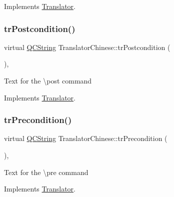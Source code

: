 Implements \mbox{\hyperlink{class_translator}{Translator}}.

\mbox{\label{class_translator_chinese_a915d9d788979b90c58b8e46849b7c747}} 
\subsubsection{\texorpdfstring{trPostcondition()}{trPostcondition()}}
{\footnotesize\ttfamily virtual \mbox{\hyperlink{class_q_c_string}{Q\+C\+String}} Translator\+Chinese\+::tr\+Postcondition (\begin{DoxyParamCaption}{ }\end{DoxyParamCaption})\hspace{0.3cm}{\ttfamily [inline]}, {\ttfamily [virtual]}}

Text for the \textbackslash{}post command 

Implements \mbox{\hyperlink{class_translator}{Translator}}.

\mbox{\label{class_translator_chinese_a6b249ec65f4342efdcbade8048e443f0}} 
\subsubsection{\texorpdfstring{trPrecondition()}{trPrecondition()}}
{\footnotesize\ttfamily virtual \mbox{\hyperlink{class_q_c_string}{Q\+C\+String}} Translator\+Chinese\+::tr\+Precondition (\begin{DoxyParamCaption}{ }\end{DoxyParamCaption})\hspace{0.3cm}{\ttfamily [inline]}, {\ttfamily [virtual]}}

Text for the \textbackslash{}pre command 

Implements \mbox{\hyperlink{class_translator}{Translator}}.

\mbox{\label{class_translator_chinese_a9c3996ac3f830460f44ba721fe5ce258}} 
